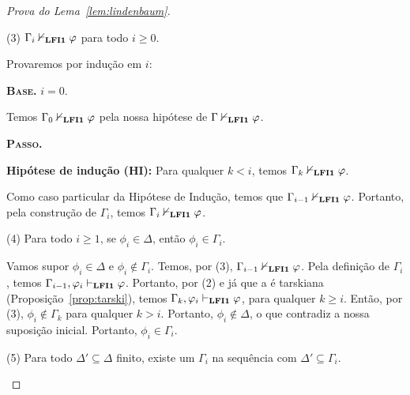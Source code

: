 \begin{proof}[Prova do Lema~\ref{lem:lindenbaum}]
\begin{adjustwidth}{1cm}{}
\begin{adjustwidth}{1cm}{}
            \end{adjustwidth}

            \noindent(3) $\Gamma_i \nvdash_{{\normalfont\textbf{LFI1}}{}} \varphi$ para todo $i \geq 0$.

            Provaremos por indução em $i$:

            \begin{adjustwidth}{1cm}{}
                \noindent\textbf{\textsc{Base.}} $i = 0$.
                
                \begin{adjustwidth}{1cm}{}
                    
                    Temos $\Gamma_0 \nvdash_{{\normalfont\textbf{LFI1}}{}} \varphi$ pela nossa hipótese de $\Gamma \nvdash_{{\normalfont\textbf{LFI1}}{}} \varphi$.
                    
                \end{adjustwidth}
                
                \noindent\textbf{\textsc{Passo.}} 
                
                \noindent\textbf{Hipótese de indução (HI):} Para qualquer $k < i$, temos $\Gamma_k \nvdash_{{\normalfont\textbf{LFI1}}{}} \varphi$.
                
                    Como caso particular da Hipótese de Indução, temos que $\Gamma_{i-1} \nvdash_{{\normalfont\textbf{LFI1}}{}} \varphi$. Portanto, pela construção de $\Gamma_i$, temos $\Gamma_i \nvdash_{{\normalfont\textbf{LFI1}}{}} \varphi$.
                    
            \end{adjustwidth}

            
            \noindent(4) Para todo $i \geq 1$, se $\phi_i \in \Delta$, então $\phi_i \in \Gamma_i$.

            \begin{adjustwidth}{1cm}{}


                Vamos supor $\phi_i \in \Delta$ e $\phi_i \not \in \Gamma_i$. Temos, por (3), $\Gamma_{i - 1} \nvdash_{{\normalfont\textbf{LFI1}}{}} \varphi$. Pela definição de $\Gamma_i$, temos $\Gamma_{i - 1}, \varphi_i \vdash_{{\normalfont\textbf{LFI1}}{}} \varphi$. Portanto, por (2) e já que a \lfium{} é tarskiana (Proposição~\ref{prop:tarski}), temos $\Gamma_k, \varphi_i \vdash_{{\normalfont\textbf{LFI1}}{}} \varphi$, para qualquer $k \geq i$. Então, por (3), $\phi_i \not \in \Gamma_k$ para qualquer $k > i$. Portanto, $\phi_i \not \in \Delta$, o que contradiz a nossa suposição inicial. Portanto, $\phi_i \in \Gamma_i$.

            \end{adjustwidth}

            \noindent(5) Para todo $\Delta' \subseteq \Delta$ finito, existe um $\Gamma_i$ na sequência com $\Delta' \subseteq \Gamma_i$.


\end{adjustwidth}
\end{proof}

